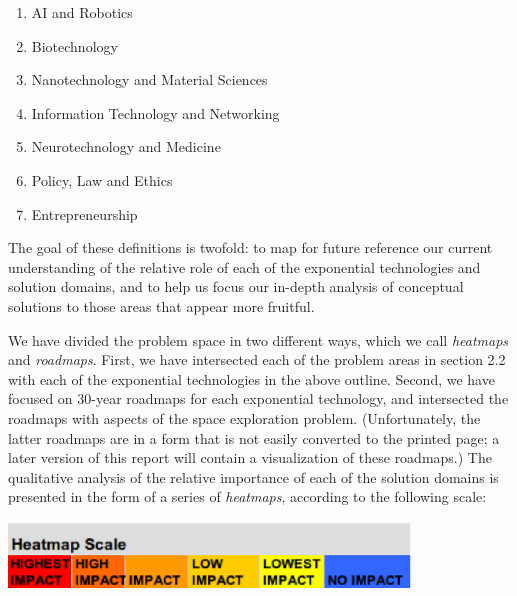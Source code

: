 \documentclass[letter,11pt]{article}
\begin{document}
\begin{enumerate}
	\item AI and Robotics \item   Biotechnology \item  Nanotechnology and Material Sciences \item  Information Technology and Networking \item  Neurotechnology and Medicine \item  Policy, Law and Ethics \item Entrepreneurship 
\end{enumerate}

The goal of these definitions is twofold: to map for future reference
our current understanding of the relative role of each of the
exponential technologies and solution domains, and to help us focus our
in-depth analysis of conceptual solutions to those areas that appear
more fruitful.

We have divided the problem space in two different ways, which we call {\em heatmaps} and {\em roadmaps}. First, we have
intersected each of the problem areas in section 2.2 with each of the
exponential technologies in the above outline. Second, we have focused on
30-year roadmaps for each exponential technology, and intersected the roadmaps
with aspects of the space exploration problem. (Unfortunately, the latter
roadmaps are in a form that is not easily converted to the printed page; a
later version of this report will contain a visualization of these roadmaps.)
The qualitative analysis of the relative importance of each of the solution
domains is presented in the form of a series of \emph{heatmaps}, according to
the following scale:\newline

\includegraphics[width=4.2in]{Heatmapscale.eps}
\newline

\newpage
\end{document}
